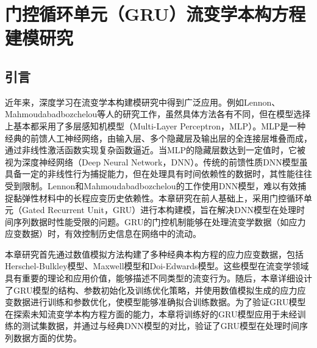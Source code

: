 \chapter{门控循环单元（GRU）流变学本构方程建模研究}
\section{引言}
近年来，深度学习在流变学本构建模研究中得到广泛应用。例如Lennon、Mahmoudabadbozchelou等人的研究工作，虽然具体方法各有不同，但在模型选择上基本都采用了多层感知机模型（Multi-Layer Perceptron，MLP）\cite{lennonScientificMachineLearning2023a,mahmoudabadbozchelouDatadrivenPhysicsinformedConstitutive2021}。MLP是一种经典的前馈人工神经网络，由输入层、多个隐藏层及输出层的全连接层堆叠而成，通过非线性激活函数实现复杂函数逼近。当MLP的隐藏层数达到一定值时，它被视为深度神经网络（Deep Neural Network，DNN）。传统的前馈性质DNN模型虽具备一定的非线性行为捕捉能力，但在处理具有时间依赖性的数据时，其性能往往受到限制。Lennon和Mahmoudabadbozchelou的工作使用DNN模型，难以有效捕捉黏弹性材料中的长程应变历史依赖性。本章研究在前人基础上，采用门控循环单元（Gated Recurrent Unit，GRU）进行本构建模，旨在解决DNN模型在处理时间序列数据时性能受限的问题。GRU的门控机制能够在处理流变学数据（如应力应变数据）时，有效控制历史信息在网络中的流动。

本章研究首先通过数值模拟方法构建了多种经典本构方程的应力应变数据，包括Herschel-Bulkley模型、Maxwell模型和Doi-Edwards模型。这些模型在流变学领域具有重要的理论和应用价值，能够描述不同类型的流变行为。随后，本章详细设计了GRU模型的结构、参数初始化及训练优化策略，并使用数值模拟生成的应力应变数据进行训练和参数优化，使模型能够准确拟合训练数据。为了验证GRU模型在探索未知流变学本构方程方面的能力，本章将训练好的GRU模型应用于未经训练的测试集数据，并通过与经典DNN模型的对比，验证了GRU模型在处理时间序列数据方面的优势。

